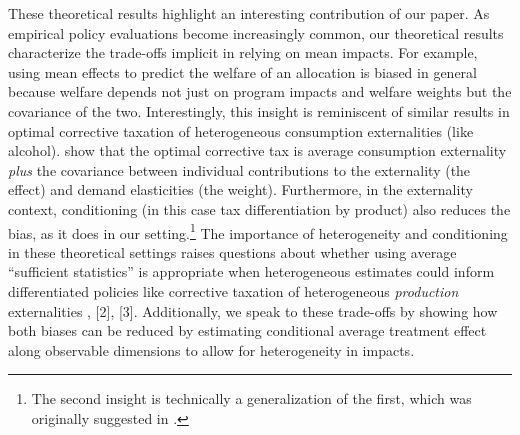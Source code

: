 \documentclass[12pt]{article}
\theoremstyle{definition}
\theoremstyle{definition}
\theoremstyle{definition}
\theoremstyle{definition}
\begin{document}

These theoretical results highlight an interesting contribution of our paper. As empirical policy evaluations become increasingly common, our theoretical results characterize the trade-offs implicit in relying on mean impacts. For example, using mean effects to predict the welfare of an allocation is biased in general because welfare depends not just on program impacts and welfare weights but the covariance of the two. Interestingly, this insight is reminiscent of similar results in optimal corrective taxation of heterogeneous consumption externalities (like alcohol). \citet{griffith2019tax} show that the optimal corrective tax is average consumption externality \textit{plus} the covariance between individual contributions to the externality (the effect) and demand elasticities (the weight). Furthermore, in the externality context, conditioning (in this case tax differentiation by product) also reduces the bias, as it does in our setting.\footnote{The second insight is technically a generalization of the first, which was originally suggested in \citet{diamond1973consumption}.} The importance of heterogeneity and conditioning in these theoretical settings raises questions about whether using average ``sufficient statistics'' is appropriate when heterogeneous estimates could inform differentiated policies like corrective taxation of heterogeneous \textit{production} externalities \citep[][]{hollingsworth2019external,fell2021emissions,sexton2021heterogeneous}, [2], [3]. Additionally, we speak to these trade-offs by showing how both biases can be reduced by estimating conditional average treatment effect along observable dimensions to allow for heterogeneity in impacts.
\end{document}
